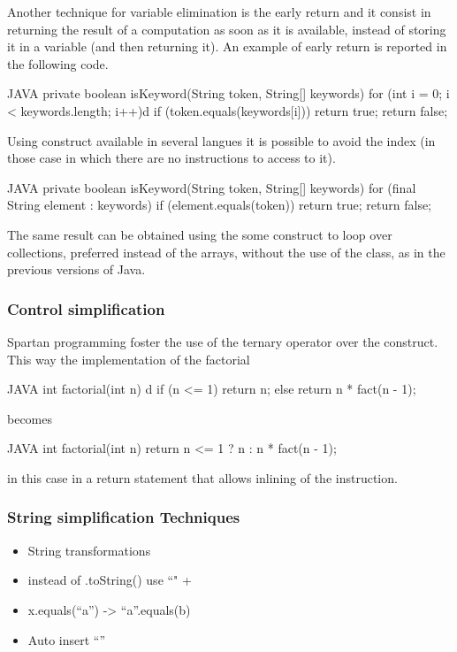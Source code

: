 Another technique for variable elimination is the early return and it consist in returning the result of a computation
as soon as it is available, instead of storing it in a variable (and then returning it).
An example of early return is reported in the following code.
\begin{code}{JAVA}
private boolean isKeyword(String token, String[] keywords) {
    for (int i = 0; i < keywords.length; i++)d
        if (token.equals(keywords[i])) 
            return true;
    return false;
}
\end{code}

Using  construct available in several langues it is possible to 
avoid the index (in those case in which there are no instructions to access to it).
\begin{code}{JAVA}
private boolean isKeyword(String token, String[] keywords) {
    for (final String element : keywords)
        if (element.equals(token))
            return true;
    return false;
}
\end{code}
The same result can be obtained using the some construct to loop over collections, 
preferred instead of the arrays, without the use of the  class, as 
in the previous versions of Java.

\subsubsection{Control simplification}
Spartan programming foster the use of the ternary operator over the  construct.
This way the implementation of the factorial
\begin{code}{JAVA}
int factorial(int n) {d
    if (n <= 1)
        return n;
    else
        return n * fact(n - 1);
}
\end{code}
becomes
\begin{code}{JAVA}
int factorial(int n) {
    return n <= 1 ? n : n * fact(n - 1);
}
\end{code}

in this case in a return statement that allows inlining of the instruction.

\subsubsection{String simplification Techniques}
\begin{itemize}
 \item String transformations
 \item instead of .toString() use ``" +
 \item x.equals(“a”) -> “a”.equals(b)
 \item Auto insert “”
\end{itemize}

